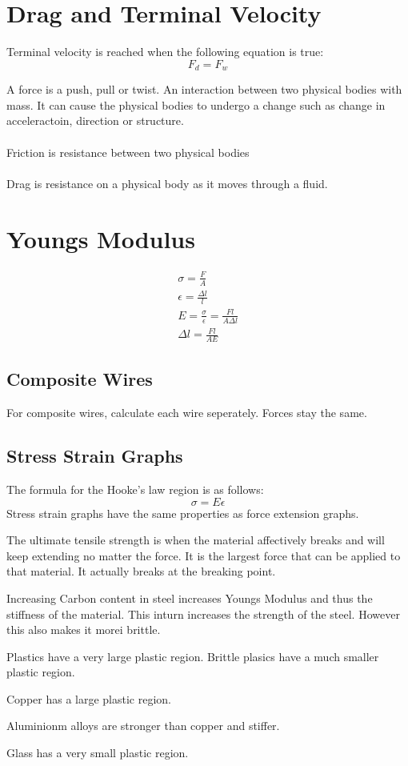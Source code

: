 \documentclass{article}
\begin{document}
\section{Drag and Terminal Velocity}
Terminal velocity is reached when the following equation is true:
\begin{equation}
	F_d = F_w
\end{equation}

A force is a push, pull or twist. An interaction between two physical bodies with mass.
It can cause the physical bodies to undergo a change such as change in acceleractoin, direction or structure.
\\\\
Friction is resistance between two physical bodies
\\\\
Drag is resistance on a physical body as it moves through a fluid.


\section{Youngs Modulus}

\begin{gather}
	\sigma = \frac{F}{A}\\
	\epsilon = \frac{\Delta l}{l}\\
	E = \frac{\sigma}{\epsilon} = \frac{Fl}{A\Delta l}\\
	\Delta l = \frac{Fl}{AE}
\end{gather}


\subsection{Composite Wires}
For composite wires, calculate each wire seperately. Forces stay the same.

\subsection{Stress Strain Graphs}

The formula for the Hooke's law region is as follows: 
\begin{equation}
	\sigma = E \epsilon
\end{equation}
Stress strain graphs have the same properties as force extension graphs.

The ultimate tensile strength is when the material affectively breaks and will keep extending no matter the force. It is the
largest force that can be applied to that material.
It actually breaks at the breaking point.

Increasing Carbon content  in steel increases Youngs Modulus and thus the stiffness of the material. This inturn increases
the strength of the steel. However this also makes it morei brittle.

Plastics have a very large plastic region. Brittle plasics have a much smaller plastic region.

Copper has a large plastic region. 

Aluminionm alloys are stronger than copper and stiffer.

Glass has a very small plastic region.
\end{document}
